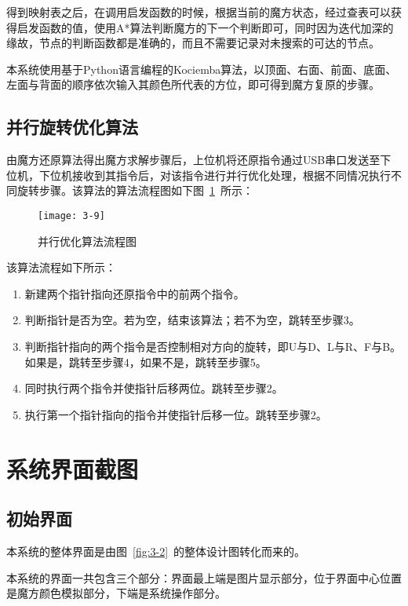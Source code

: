得到映射表之后，在调用启发函数的时候，根据当前的魔方状态，经过查表可以获得启发函数的值，使用A*算法判断魔方的下一个判断即可，同时因为迭代加深的缘故，节点的判断函数都是准确的，而且不需要记录对未搜索的可达的节点。

本系统使用基于Python语言编程的Kociemba算法，以顶面、右面、前面、底面、左面与背面的顺序依次输入其颜色所代表的方位，即可得到魔方复原的步骤。

\subsection{并行旋转优化算法}

由魔方还原算法得出魔方求解步骤后，上位机将还原指令通过USB串口发送至下位机，下位机接收到其指令后，对该指令进行并行优化处理，根据不同情况执行不同旋转步骤。该算法的算法流程图如下图~\ref{fig:3-9}~所示：

\begin{figure}[H]
	\centering
	\texttt{[image: 3-9]}
	\caption{并行优化算法流程图}\label{fig:3-9}
\end{figure}

\noindent 该算法流程如下所示：

\begin{enumerate}[itemsep=2pt,topsep=0pt,parsep=0pt]
	\item 新建两个指针指向还原指令中的前两个指令。
	\item 判断指针是否为空。若为空，结束该算法；若不为空，跳转至步骤3。
	\item 判断指针指向的两个指令是否控制相对方向的旋转，即U与D、L与R、F与B。如果是，跳转至步骤4，如果不是，跳转至步骤5。
	\item 同时执行两个指令并使指针后移两位。跳转至步骤2。
	\item 执行第一个指针指向的指令并使指针后移一位。跳转至步骤2。
\end{enumerate}

\section{系统界面截图}

\subsection{初始界面}

本系统的整体界面是由图~\ref{fig:3-2}~的整体设计图转化而来的。

本系统的界面一共包含三个部分：界面最上端是图片显示部分，位于界面中心位置是魔方颜色模拟部分，下端是系统操作部分。

